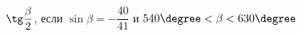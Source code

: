 \begin{ex}[type=simplify_calculate]
	\begin{condition}
		\( \tg\dfrac{\beta}{2} \), \quad если \( \sin\beta=-\dfrac{40}{41} \) и \( 540\degree<\beta<630\degree \)
	\end{condition}
\end{ex}